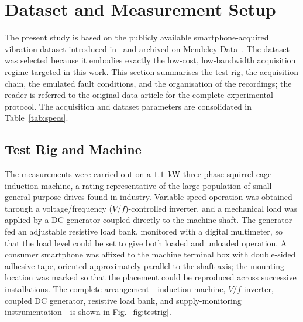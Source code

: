 
\section{Dataset and Measurement Setup}
\label{sec:dataset}

The present study is based on the publicly available smartphone-acquired
vibration dataset introduced in~\cite{ertargin2026smartphone} and archived on
Mendeley Data~\cite{ertargin2026dataset}. The dataset was selected because it
embodies exactly the low-cost, low-bandwidth acquisition regime targeted in this
work. This section summarises the test rig, the acquisition chain, the emulated
fault conditions, and the organisation of the recordings; the reader is referred
to the original data article for the complete experimental protocol. The
acquisition and dataset parameters are consolidated in
Table~\ref{tab:specs}.

\subsection{Test Rig and Machine}
The measurements were carried out on a $1.1$~kW three-phase squirrel-cage
induction machine, a rating representative of the large population of small
general-purpose drives found in industry. Variable-speed operation was obtained
through a voltage/frequency ($V/f$)-controlled inverter, and a mechanical load
was applied by a DC generator coupled directly to the machine shaft. The
generator fed an adjustable resistive load bank, monitored with a digital
multimeter, so that the load level could be set to give both loaded and unloaded
operation. A consumer smartphone was affixed to the machine
terminal box with double-sided adhesive tape, oriented approximately parallel to
the shaft axis; the mounting location was marked so that the placement could be
reproduced across successive installations. The complete arrangement---induction
machine, $V/f$ inverter, coupled DC generator, resistive load bank, and
supply-monitoring instrumentation---is shown in Fig.~\ref{fig:testrig}.

